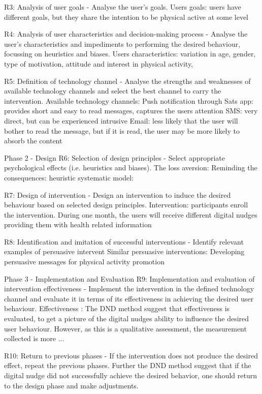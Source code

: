 R3: Analysis of user goals - Analyse the user’s goals. 
Users goals: users have different goals, but they share the intention to be physical active at some level 

R4: Analysis of user characteristics and decision-making process - Analyse the user’s characteristics and impediments to performing the desired behaviour, focussing on heuristics and biases. 
Users characteristics: variation in age, gender, type of motivation, attitude and interest in physical activity,

R5: Definition of technology channel - Analyse the strengths and weaknesses of available technology channels and select the best channel to carry the intervention.
Available technology channels: 
Push notification through Sats app: provides short and easy to read messages, captures the users attention
SMS: very direct, but can be experienced intrusive 
Email: less likely that the user will bother to read the message, but if it is read, the user may be more likely to absorb the content

Phase 2 - Design 
R6: Selection of design principles - Select appropriate psychological effects (i.e. heuristics and biases). 
The loss aversion: 
Reminding the consequences: 
heuristic systematic model: 

R7: Design of intervention - Design an intervention to induce the desired behaviour based on selected design principles. 
Intervention: participants enroll the intervention. During one month, the users will receive different digital nudges providing them with health related information 

R8: Identification and imitation of successful interventions - Identify relevant examples of persuasive intervent
Similar persuasive interventions: 
Developing persuasive messages for physical activity promotion
 

Phase 3 - Implementation and Evaluation 
R9: Implementation and evaluation of intervention effectiveness - Implement the intervention in the defined technology channel and evaluate it in terms of its effectiveness in achieving the desired user behaviour. 
Effectiveness : The DND method suggest that effectiveness is evaluated, to get a picture of the digital nudges ability to influence the desired user behaviour. However, as this is a qualitative assessment, the measurement collected is more ...

R10: Return to previous phases - If the intervention does not produce the desired effect, repeat the previous phases. 
Further the DND method suggest that if the digital nudge did not successfully achieve the desired behavior, one should return to the design phase and make adjustments.   

